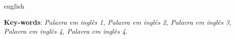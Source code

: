 \setlength{\absparsep}{18pt} %
\begin{resumo}[Abstract]
    \begin{otherlanguage*}{english}

        \lipsum[3-4]
        	
    	\vspace{\onelineskip}
    
    	\noindent
    	\textbf{Key-words}: \textit{Palavra em inglês 1, Palavra em inglês 2, Palavra em inglês 3, Palavra em inglês 4, Palavra em inglês 4}.

    \end{otherlanguage*}
\end{resumo}